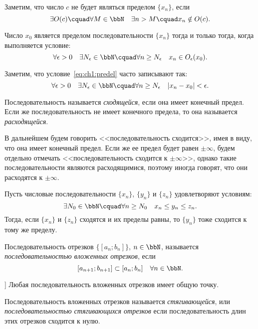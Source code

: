 Заметим, что число $c$ не будет являться пределом $\{x_n\}$, если 
$$
\exists O(c)\cquad \forall M \in \bbN\quad \exists n > M\cquad x_n \notin O(c).
$$
\begin{lemm}
Число $x_0$ является пределом последовательности $\{x_n\}$ тогда и только тогда, когда выполняется условие:
\begin{equation}
\label{eq:ch1:predel}
\forall \epsilon>0\quad \exists N_\epsilon \in \bbN\cquad \forall n \ge N_\epsilon\quad x_n \in O_\epsilon(x_0).
\end{equation}
\end{lemm}
Заметим, что условие~\eqref{eq:ch1:predel} часто записывают так:
$$
\forall \epsilon>0\quad \exists N_\epsilon \in \bbN\cquad \forall n \ge N_\epsilon\quad |x_n-x_0|<\epsilon.
$$
\begin{defn}
Последовательность называется \textit{сходящейся}, если она имеет конечный предел. Если же последовательность не имеет конечного предела, то она называется \textit{расходящейся}.
\end{defn}
В дальнейшем будем говорить <<последовательность сходится>>, имея в виду, что она имеет конечный предел. Если же ее предел будет равен $\pm\infty$, будем отдельно отмечать <<последовательность сходится к $\pm\infty$>>, однако такие последовательности являются расходящимися, поэтому иногда говорят, что они расходятся к $\pm\infty$. 
\begin{thm} \label{th:ch1:otrehposled}  
Пусть числовые последовательности $\{x_n\}$, $\{y_n\}$ и $\{z_n\}$ удовлетворяют условиям:
$$
\exists N_0 \in \bbN\cquad \forall n\ge N_0 \quad x_n \le y_n \le z_n.
$$
Тогда, если $\{x_n\}$ и $\{z_n\}$ сходятся и их пределы равны, то $\{y_n\}$ тоже сходится к тому же пределу.
\end{thm}

\begin{defn}
Последовательность отрезков $\{[a_n;b_n]\}$, $n \in \bbN$, называется \textit{последовательностью вложенных отрезков}, если
$$
[a_{n+1};b_{n+1}]\subset [a_n;b_n]\quad \forall n \in \bbN.
$$
\end{defn}

\begin{thm}]
Любая последовательность вложенных отрезков имеет общую точку.
\end{thm}

\begin{defn}
Последовательность вложенных отрезков называется \textit{стягивающейся}, или \textit{последовательностью стягивающихся отрезков} если последовательность длин этих отрезков сходится к нулю.
\end{defn}

